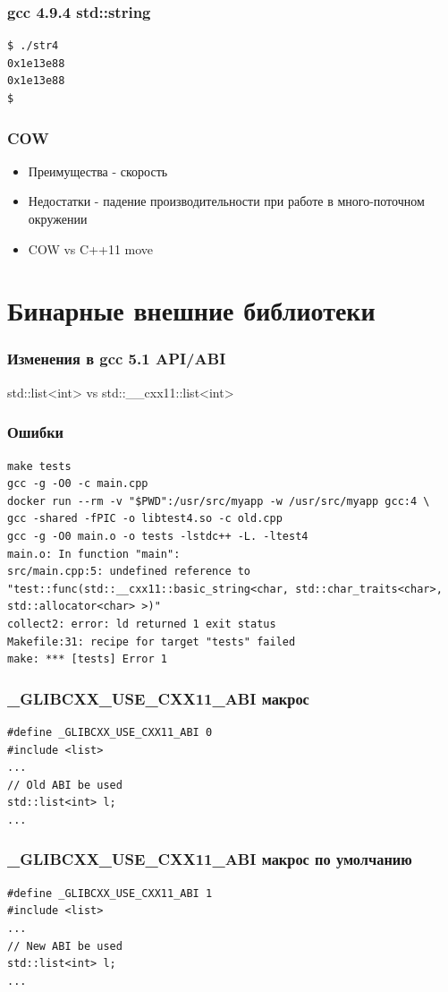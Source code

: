 \documentclass{beamer}
\begin{document}
\begin{frame}[fragile]
\frametitle{gcc 4.9.4 std::string}
\begin{verbatim}
$ ./str4
0x1e13e88
0x1e13e88
$
\end{verbatim}
\end{frame}


\begin{frame}[fragile]
\frametitle{COW}
\begin{itemize}
\item Преимущества - скорость
\item Недостатки - падение производительности при работе в
  много-поточном окружении
\item COW vs C++11 move
\end{itemize}
\end{frame}


\section{Бинарные внешние библиотеки}

\begin{frame}[fragile]
\frametitle{Изменения в gcc 5.1 API/ABI}
std::list<int> vs 
std::\_\_cxx11::list<int>
\end{frame}

\begin{frame}[fragile]
\frametitle{Ошибки}
\begin{verbatim}
make tests
gcc -g -O0 -c main.cpp 
docker run --rm -v "$PWD":/usr/src/myapp -w /usr/src/myapp gcc:4 \
gcc -shared -fPIC -o libtest4.so -c old.cpp
gcc -g -O0 main.o -o tests -lstdc++ -L. -ltest4
main.o: In function "main":
src/main.cpp:5: undefined reference to 
"test::func(std::__cxx11::basic_string<char, std::char_traits<char>, 
std::allocator<char> >)"
collect2: error: ld returned 1 exit status
Makefile:31: recipe for target "tests" failed
make: *** [tests] Error 1
\end{verbatim}
\end{frame}

\begin{frame}[fragile]
\frametitle{\_GLIBCXX\_USE\_CXX11\_ABI макрос}
\begin{verbatim}
#define _GLIBCXX_USE_CXX11_ABI 0
#include <list>
...
// Old ABI be used
std::list<int> l;
...
\end{verbatim} 
\end{frame}

\begin{frame}[fragile]
\frametitle{\_GLIBCXX\_USE\_CXX11\_ABI макрос по умолчанию}
\begin{verbatim}
#define _GLIBCXX_USE_CXX11_ABI 1
#include <list>
...
// New ABI be used
std::list<int> l;
...
\end{verbatim} 
\end{frame}
\end{document}
